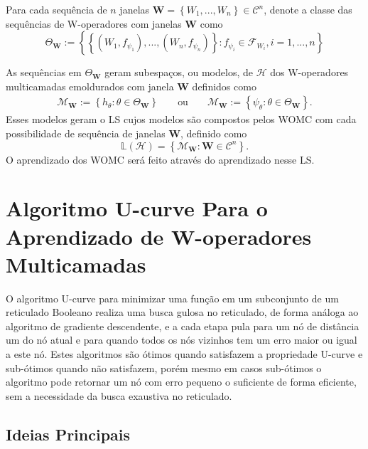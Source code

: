 Para cada sequência de $n$ janelas $\textbf{W} = \left\{ W_{1},...,W_{n} \right\} \in \mathscr{C}^{n} $, denote a classe das sequências de W-operadores com janelas $\textbf{W}$ como
\begin{equation}
    \Theta_{\textbf{W}} := \left\{ \left\{ \left( W_{1}, f_{\psi_{1}} \right),..., \left( W_{n}, f_{\psi_{n}} \right) \right\} : f_{\psi_{i}} \in \mathcal{F}_{W_{i}}, i=1,...,n \right\}
    \label{eq:ThetaW}
\end{equation}

As sequências em $\Theta_{\textbf{W}}$ geram subespaços, ou modelos, de $\mathcal{H}$ dos W-operadores multicamadas emoldurados com janela $\textbf{W}$ definidos como
\begin{align*}
    \mathcal{M}_{\textbf{W}} := \left\{ h_{\theta} : \theta \in \Theta_{\textbf{W}} \right\}  & & \text{ ou } & & \mathcal{M}_{\textbf{W}} := \left\{ \psi_{\theta} : \theta \in \Theta_{\textbf{W}} \right\}.
\end{align*}
Esses modelos geram o LS cujos modelos são compostos pelos WOMC com cada possibilidade de sequência de janelas $\textbf{W}$, definido como
\begin{equation}
    \mathbb{L} \left( \mathcal{H} \right) = \left\{ \mathcal{M}_{\textbf{W}}: \textbf{W} \in \mathscr{C}^{n} \right\}.
    \label{eq:ls}
\end{equation}
O aprendizado dos WOMC será feito através do aprendizado nesse LS.

\section{Algoritmo U-curve Para o Aprendizado de W-operadores Multicamadas}

O algoritmo U-curve \cite{REIS201997} para minimizar uma função em um subconjunto de um reticulado Booleano realiza uma busca gulosa no reticulado, de forma análoga ao algoritmo de gradiente descendente, e a cada etapa pula para um nó de distância um do nó atual e para quando todos os nós vizinhos tem um erro maior ou igual a este nó. Estes algoritmos são ótimos quando satisfazem a propriedade U-curve \cite{marcondes2021learning} e sub-ótimos quando não satisfazem, porém mesmo em casos sub-ótimos o algoritmo pode retornar um nó com erro pequeno o suficiente de forma eficiente, sem a necessidade da busca exaustiva no reticulado.

\subsection{Ideias Principais}
\label{subsec:alg_ideiasprinc}

